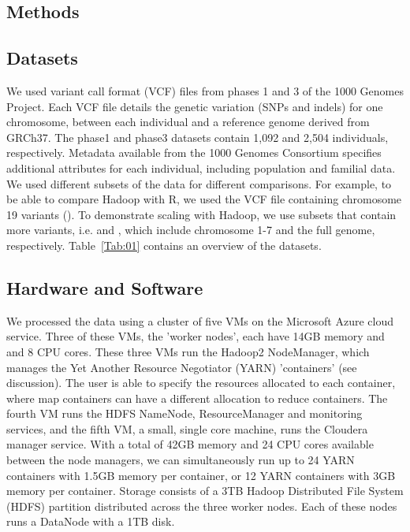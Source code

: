 \documentclass{bioinfo}
\begin{document}
\begin{methods}
\section{Methods}
\subsection*{Datasets}
We used variant call format (VCF) files from phases 1 and 3 of the 1000 Genomes Project.
Each VCF file details the genetic variation (SNPs and indels) for one chromosome, between each individual and a reference genome derived from GRCh37. 
The phase1 and phase3 datasets contain 1,092 and 2,504 individuals, respectively.
Metadata available from the 1000 Genomes Consortium specifies additional attributes for each individual, including population and familial data.\\
We used different subsets of the data for different comparisons. For example, to be able to compare Hadoop with R, we used the VCF file containing chromosome 19 variants (\NinteenPhaseone{}).
To demonstrate scaling with Hadoop, we use subsets that contain more variants, i.e. \SevenPhaseone{} and \FullPhaseone{}, which include chromosome 1-7 and the full genome, respectively.
Table~\ref{Tab:01} contains an overview of the datasets.

\subsection*{Hardware and Software}
We processed the data using a cluster of five VMs on the Microsoft Azure cloud service. Three of these VMs, the 'worker nodes', each have 14GB memory and and 8 CPU cores. These three VMs run the Hadoop2 NodeManager, which manages the Yet Another Resource Negotiator (YARN) 'containers' (see discussion).
The user is able to specify the resources allocated to each container, where map containers can have a different allocation to reduce containers.
The fourth VM runs the HDFS NameNode, ResourceManager and monitoring services, and the fifth VM, a small, single core machine, runs the Cloudera manager service.
With a total of 42GB memory and 24 CPU cores available between the node managers, we can simultaneously run up to 24 YARN containers with 1.5GB memory per container, or 12 YARN containers with 3GB memory per container.
Storage consists of a 3TB Hadoop Distributed File System (HDFS) partition distributed across the three worker nodes. Each of these nodes runs a DataNode with a 1TB disk.


\end{methods}
\end{document}
